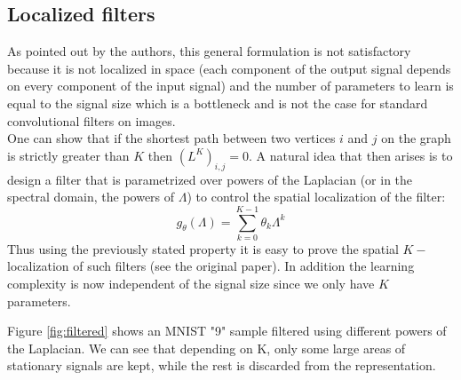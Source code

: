 \subsection{Localized filters}

As pointed out by the authors, this general formulation is not satisfactory because it is not localized in space (each component of the output signal depends on every component of the input signal) and the number of parameters to learn is equal to the signal size which is a bottleneck and is not the case for standard convolutional filters on images.\\

One can show \cite{hammond2011wavelets} that if the shortest path between two vertices $i$ and $j$ on the graph is strictly greater than $K$ then $(L^K)_{i,j} = 0$. A natural idea that then arises is to design a filter that is parametrized over powers of the Laplacian (or in the spectral domain, the powers of $\Lambda$) to control the spatial localization of the filter:
%
\begin{equation}
    g_\theta(\Lambda) = \sum_{k=0}^{K-1} \theta_k \Lambda^k \label{eq:localized_filter}
\end{equation}
%
Thus using the previously stated property it is easy to prove the spatial $K-$localization of such filters (see the original paper). In addition the learning complexity is now independent of the signal size since we only have $K$ parameters. 

Figure \ref{fig:filtered} shows an MNIST "9" sample filtered using different powers of the Laplacian. We can see that depending on K, only some large areas of stationary signals are kept, while the rest is discarded from the representation.

